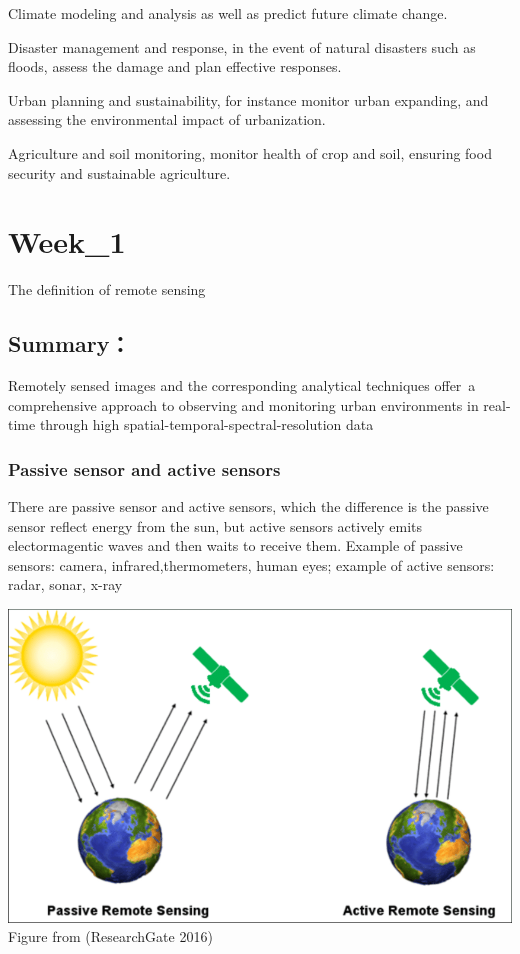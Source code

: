 \documentclass[
  letterpaper,
  DIV=11,
  numbers=noendperiod]{scrreprt}
\begin{document}
Climate modeling and analysis as well as predict future climate change.

Disaster management and response, in the event of natural disasters such
as floods, assess the damage and plan effective responses.

Urban planning and sustainability, for instance monitor urban expanding,
and assessing the environmental impact of urbanization.

Agriculture and soil monitoring, monitor health of crop and soil,
ensuring food security and sustainable agriculture.


\chapter{Week\_1}\label{week_1}

The definition of remote sensing

\section{Summary：}\label{summary}

Remotely sensed images and the corresponding analytical techniques
offer~a comprehensive approach to observing and monitoring urban
environments in real-time through high
spatial-temporal-spectral-resolution data

\subsection{Passive sensor and active
sensors}\label{passive-sensor-and-active-sensors}

There are passive sensor and active sensors, which the difference is the
passive sensor reflect energy from the sun, but active sensors actively
emits electormagentic waves and then waits to receive them. Example of
passive sensors: camera, infrared,thermometers, human eyes; example of
active sensors: radar, sonar, x-ray

\includegraphics{Differences-between-passive-and-active-sensors.png}
Figure from (ResearchGate 2016)
\end{document}

